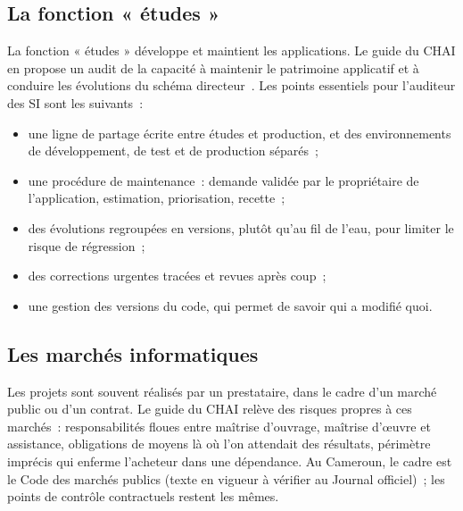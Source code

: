 \subsection{La fonction « études »}

La fonction « études » développe et maintient les applications. Le guide
du CHAI en propose un audit de la capacité à maintenir le patrimoine
applicatif et à conduire les évolutions du schéma
directeur~\cite{chai2014guide}. Les points essentiels pour l'auditeur des
SI sont les suivants~:
\begin{itemize}
    \item une ligne de partage écrite entre études et production, et des
          environnements de développement, de test et de production
          séparés~;
    \item une procédure de maintenance~: demande validée par le
          propriétaire de l'application, estimation, priorisation, recette~;
    \item des évolutions regroupées en versions, plutôt qu'au fil de
          l'eau, pour limiter le risque de régression~;
    \item des corrections urgentes tracées et revues après coup~;
    \item une gestion des versions du code, qui permet de savoir qui a
          modifié quoi.
\end{itemize}

\subsection{Les marchés informatiques}

Les projets sont souvent réalisés par un prestataire, dans le cadre d'un
marché public ou d'un contrat. Le guide du CHAI relève des risques propres
à ces marchés~: responsabilités floues entre maîtrise d'ouvrage,
maîtrise d'œuvre et assistance, obligations de moyens là où l'on attendait
des résultats, périmètre imprécis qui enferme l'acheteur dans une
dépendance. Au Cameroun, le cadre est le Code des marchés publics (texte
en vigueur à vérifier au Journal officiel)~; les points de contrôle
contractuels restent les mêmes.

